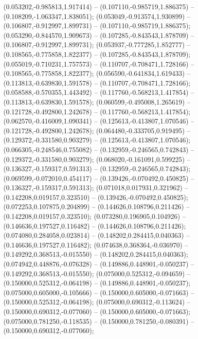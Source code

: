  (0.053202,-0.985813,1.917414) -- (0.107110,-0.985719,1.886375) -- (0.108209,-1.063347,1.838051);
 (0.053049,-0.913574,1.930899) -- (0.106807,-0.912997,1.899731) -- (0.107110,-0.985719,1.886375);
 (0.053290,-0.844570,1.909673) -- (0.107285,-0.843543,1.878709) -- (0.106807,-0.912997,1.899731);
 (0.053937,-0.777285,1.852777) -- (0.108565,-0.775858,1.822377) -- (0.107285,-0.843543,1.878709);
 (0.055019,-0.710231,1.757573) -- (0.110707,-0.708471,1.728166) -- (0.108565,-0.775858,1.822377);
 (0.056590,-0.641834,1.619433) -- (0.113813,-0.639830,1.591578) -- (0.110707,-0.708471,1.728166);
 (0.058588,-0.570355,1.443492) -- (0.117760,-0.568213,1.417854) -- (0.113813,-0.639830,1.591578);
 (0.060599,-0.495008,1.265619) -- (0.121728,-0.492800,1.242678) -- (0.117760,-0.568213,1.417854);
 (0.062570,-0.416009,1.090341) -- (0.125613,-0.413807,1.070546) -- (0.121728,-0.492800,1.242678);
 (0.064480,-0.333705,0.919495) -- (0.129372,-0.331580,0.903279) -- (0.125613,-0.413807,1.070546);
 (0.066305,-0.248546,0.755082) -- (0.132959,-0.246565,0.742843) -- (0.129372,-0.331580,0.903279);
 (0.068020,-0.161091,0.599225) -- (0.136327,-0.159317,0.591313) -- (0.132959,-0.246565,0.742843);
 (0.069599,-0.072010,0.454117) -- (0.139426,-0.070492,0.450825) -- (0.136327,-0.159317,0.591313);
 (0.071018,0.017931,0.321962) -- (0.142208,0.019157,0.323510) -- (0.139426,-0.070492,0.450825);
 (0.072253,0.107875,0.204899) -- (0.144626,0.108796,0.211426) -- (0.142208,0.019157,0.323510);
 (0.073280,0.196905,0.104926) -- (0.146636,0.197527,0.116482) -- (0.144626,0.108796,0.211426);
 (0.074080,0.284058,0.023814) -- (0.148202,0.284415,0.040363) -- (0.146636,0.197527,0.116482);
 (0.074638,0.368364,-0.036970) -- (0.149292,0.368513,-0.015550) -- (0.148202,0.284415,0.040363);
 (0.074942,0.448876,-0.076328) -- (0.149886,0.448901,-0.050237) -- (0.149292,0.368513,-0.015550);
 (0.075000,0.525312,-0.094659) -- (0.150000,0.525312,-0.064198) -- (0.149886,0.448901,-0.050237);
 (0.075000,0.605000,-0.105666) -- (0.150000,0.605000,-0.071663) -- (0.150000,0.525312,-0.064198);
 (0.075000,0.690312,-0.113624) -- (0.150000,0.690312,-0.077060) -- (0.150000,0.605000,-0.071663);
 (0.075000,0.781250,-0.118535) -- (0.150000,0.781250,-0.080391) -- (0.150000,0.690312,-0.077060);
